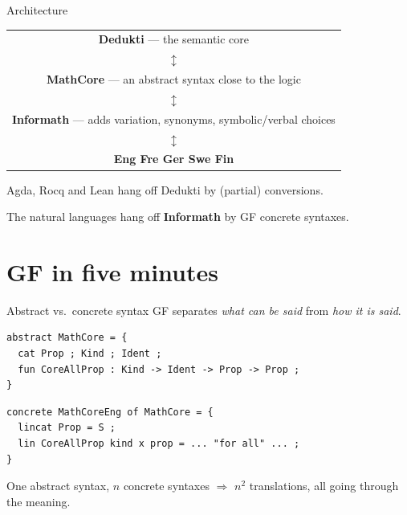 \documentclass[10pt,aspectratio=169]{beamer}
\begin{document}
\begin{frame}{Architecture}
  \begin{center}
  \begin{tabular}{c}
    \textbf{Dedukti} --- the semantic core \\
    $\updownarrow$ \\
    \textbf{MathCore} --- an abstract syntax close to the logic \\
    $\updownarrow$ \\
    \textbf{Informath} --- adds variation, synonyms, symbolic/verbal choices \\
    $\updownarrow$ \\
    \textbf{Eng \quad Fre \quad Ger \quad Swe \quad \alert{Fin}} \\
  \end{tabular}
  \end{center}

  \vspace{1em}
  Agda, Rocq and Lean hang off Dedukti by (partial) conversions.

  The natural languages hang off \textbf{Informath} by GF concrete syntaxes.
\end{frame}

\section{GF in five minutes}

\begin{frame}[fragile]{Abstract vs.\ concrete syntax}
  GF separates \emph{what can be said} from \emph{how it is said}.

\begin{lstlisting}
abstract MathCore = {
  cat Prop ; Kind ; Ident ;
  fun CoreAllProp : Kind -> Ident -> Prop -> Prop ;
}
\end{lstlisting}

\begin{lstlisting}
concrete MathCoreEng of MathCore = {
  lincat Prop = S ;
  lin CoreAllProp kind x prop = ... "for all" ... ;
}
\end{lstlisting}

  \vspace{0.5em}
  One abstract syntax, $n$ concrete syntaxes $\Rightarrow$ $n^2$ translations,
  all going through the meaning.
\end{frame}
\end{document}
